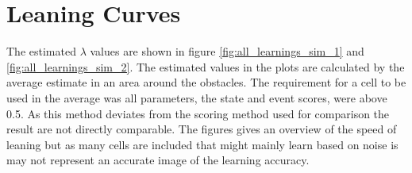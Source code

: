 \chapter{Leaning Curves}
\label{appendix:learning_curves}
The estimated $\lambda$ values are shown in figure \ref{fig:all_learnings_sim_1} and \ref{fig:all_learnings_sim_2}. The estimated values in the plots are calculated by the average estimate in an area around the obstacles. The requirement for a cell to be used in the average was all parameters, the state and event scores, were above 0.5. As this method deviates from the scoring method used for comparison the result are not directly comparable.
The figures gives an overview of the speed of leaning but as many cells are included that might mainly learn based on noise is may not represent an accurate image of the learning accuracy.


